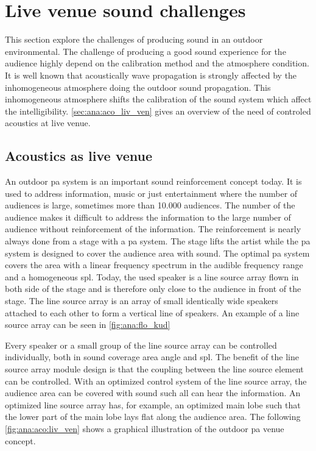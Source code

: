 \section{Live venue sound challenges}
This section explore the challenges of producing sound in an outdoor environmental. The challenge of producing a good sound experience for the audience highly depend on the calibration method and the atmosphere condition. It is well known that acoustically wave propagation is strongly affected by the inhomogeneous atmosphere doing the outdoor sound propagation. This inhomogeneous atmosphere shifts the calibration of the sound system which affect the intelligibility. \autoref{sec:ana:aco_liv_ven} gives an overview of the need of controled acoustics at live venue.


\subsection{Acoustics as live venue}\label{sec:ana:aco_liv_ven}
An outdoor \gls{pa} system is an important sound reinforcement concept today. It is used to address information, music or just entertainment where the number of audiences is large, sometimes more than 10.000 audiences. The number of the audience makes it difficult to address the information to the large number of audience without reinforcement of the information. The reinforcement is nearly always done from a stage with a \gls{pa} system. The stage lifts the artist while the \gls{pa} system is designed to cover the audience area with sound. The optimal \gls{pa} system covers the area with a linear frequency spectrum in the audible frequency range and a homogeneous \gls{spl}. Today, the used speaker is a line source array flown in both side of the stage and is therefore only close to the audience in front of the stage. The line source array is an array of small identically wide speakers attached to each other to form a vertical line of speakers. An example of a line source array can be seen in \autoref{fig:ana:flo_kud}


Every speaker or a small group of the line source array can be controlled individually, both in sound coverage area angle and \gls{spl}. The benefit of the line source array module design is that the coupling between the line source element can be controlled. With an optimized control system of the line source array, the audience area can be covered with sound such all can hear the information. An optimized line source array has, for example, an optimized main lobe such that the lower part of the main lobe lays flat along the audience area.
The following \autoref{fig:ana:aco:liv_ven} shows a graphical illustration of the outdoor \gls{pa} venue concept.

